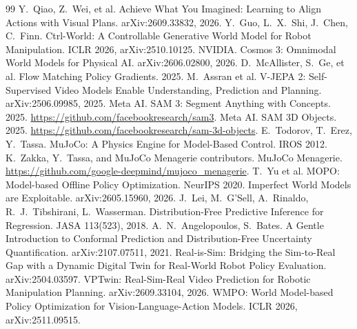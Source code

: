 \documentclass[11pt,a4paper]{article}
\theoremstyle{plain}
\theoremstyle{definition}
\theoremstyle{remark}
\begin{document}
\begin{thebibliography}{99}\small
{} Y.~Qiao, Z.~Wei, et al. Achieve What You Imagined: Learning to Align Actions with Visual Plans. arXiv:2609.33832, 2026.
 Y.~Guo, L.~X.~Shi, J.~Chen, C.~Finn. Ctrl-World: A Controllable Generative World Model for Robot Manipulation. ICLR 2026, arXiv:2510.10125.
 NVIDIA. Cosmos 3: Omnimodal World Models for Physical AI. arXiv:2606.02800, 2026.
 D.~McAllister, S.~Ge, et al. Flow Matching Policy Gradients. 2025.
 M.~Assran et al. V-JEPA 2: Self-Supervised Video Models Enable Understanding, Prediction and Planning. arXiv:2506.09985, 2025.
 Meta AI. SAM 3: Segment Anything with Concepts. 2025. \url{https://github.com/facebookresearch/sam3}.
 Meta AI. SAM 3D Objects. 2025. \url{https://github.com/facebookresearch/sam-3d-objects}.
 E.~Todorov, T.~Erez, Y.~Tassa. MuJoCo: A Physics Engine for Model-Based Control. IROS 2012.
 K.~Zakka, Y.~Tassa, and MuJoCo Menagerie contributors. MuJoCo Menagerie. \url{https://github.com/google-deepmind/mujoco_menagerie}.
 T.~Yu et al. MOPO: Model-based Offline Policy Optimization. NeurIPS 2020.
 Imperfect World Models are Exploitable. arXiv:2605.15960, 2026.
 J.~Lei, M.~G'Sell, A.~Rinaldo, R.~J.~Tibshirani, L.~Wasserman. Distribution-Free Predictive Inference for Regression. JASA 113(523), 2018.
 A.~N.~Angelopoulos, S.~Bates. A Gentle Introduction to Conformal Prediction and Distribution-Free Uncertainty Quantification. arXiv:2107.07511, 2021.
 Real-is-Sim: Bridging the Sim-to-Real Gap with a Dynamic Digital Twin for Real-World Robot Policy Evaluation. arXiv:2504.03597.
 VPTwin: Real-Sim-Real Video Prediction for Robotic Manipulation Planning. arXiv:2609.33104, 2026.
 WMPO: World Model-based Policy Optimization for Vision-Language-Action Models. ICLR 2026, arXiv:2511.09515.
\end{thebibliography}
\end{document}
